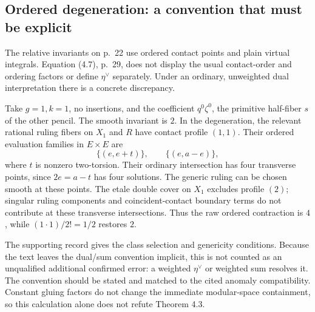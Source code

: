 \documentclass[10pt]{article}
\begin{document}
\subsection*{Ordered degeneration: a convention that must be explicit}
The relative invariants on p. 22 use ordered contact points and plain virtual integrals. Equation (4.7), p. 29, does not display the usual contact-order and ordering factors or define \(\eta^\vee\) separately. Under an ordinary, unweighted dual interpretation there is a concrete discrepancy.\par
Take \(g=1,k=1\), no insertions, and the coefficient \(q^0\zeta^0\), the primitive half-fiber \(s\) of the other pencil. The smooth invariant is \(2\). In the degeneration, the relevant rational ruling fibers on \(X_1\) and \(R\) have contact profile \((1,1)\). Their ordered evaluation families in \(E\times E\) are \[\{(e,e+t)\},\qquad \{(e,a-e)\},\] where \(t\) is nonzero two-torsion. Their ordinary intersection has four transverse points, since \(2e=a-t\) has four solutions. The generic ruling can be chosen smooth at these points. The etale double cover on \(X_1\) excludes profile \((2)\); singular ruling components and coincident-contact boundary terms do not contribute at these transverse intersections. Thus the raw ordered contraction is \(4\), while \((1\cdot1)/2!=1/2\) restores \(2\).\par
The supporting record gives the class selection and genericity conditions. Because the text leaves the dual/sum convention implicit, this is not counted as an unqualified additional confirmed error: a weighted \(\eta^\vee\) or weighted sum resolves it. The convention should be stated and matched to the cited anomaly compatibility. Constant gluing factors do not change the immediate modular-space containment, so this calculation alone does not refute Theorem 4.3.\par
\end{document}

